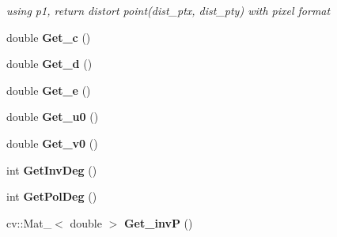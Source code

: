 \begin{DoxyCompactItemize}
\begin{DoxyCompactList}\small\item\em using p1, return distort point(dist\+\_\+ptx, dist\+\_\+pty) with pixel format \end{DoxyCompactList}\item 
double {\bfseries Get\+\_\+c} ()\hypertarget{classMultiColSLAM_1_1cCamModelGeneral___a655e3c58d273b15831d84ae96a27fcb0}{}\label{classMultiColSLAM_1_1cCamModelGeneral___a655e3c58d273b15831d84ae96a27fcb0}

\item 
double {\bfseries Get\+\_\+d} ()\hypertarget{classMultiColSLAM_1_1cCamModelGeneral___a366478b0d58a574cb3dae435aebfaeef}{}\label{classMultiColSLAM_1_1cCamModelGeneral___a366478b0d58a574cb3dae435aebfaeef}

\item 
double {\bfseries Get\+\_\+e} ()\hypertarget{classMultiColSLAM_1_1cCamModelGeneral___a55b4ed20744dbd1689a2c893fc5b4d43}{}\label{classMultiColSLAM_1_1cCamModelGeneral___a55b4ed20744dbd1689a2c893fc5b4d43}

\item 
double {\bfseries Get\+\_\+u0} ()\hypertarget{classMultiColSLAM_1_1cCamModelGeneral___a049554288f2a91d73f74967647063dab}{}\label{classMultiColSLAM_1_1cCamModelGeneral___a049554288f2a91d73f74967647063dab}

\item 
double {\bfseries Get\+\_\+v0} ()\hypertarget{classMultiColSLAM_1_1cCamModelGeneral___a4bb388fd7b1e0b95a1c85a21ed3096e1}{}\label{classMultiColSLAM_1_1cCamModelGeneral___a4bb388fd7b1e0b95a1c85a21ed3096e1}

\item 
int {\bfseries Get\+Inv\+Deg} ()\hypertarget{classMultiColSLAM_1_1cCamModelGeneral___aab749faa195689bbac612c8579d2651f}{}\label{classMultiColSLAM_1_1cCamModelGeneral___aab749faa195689bbac612c8579d2651f}

\item 
int {\bfseries Get\+Pol\+Deg} ()\hypertarget{classMultiColSLAM_1_1cCamModelGeneral___a7bb2f12c44cd6e808506b4a6c38b1cc2}{}\label{classMultiColSLAM_1_1cCamModelGeneral___a7bb2f12c44cd6e808506b4a6c38b1cc2}

\item 
cv\+::\+Mat\+\_\+$<$ double $>$ {\bfseries Get\+\_\+invP} ()\hypertarget{classMultiColSLAM_1_1cCamModelGeneral___a6bb961e22ed4b0792031907e24dc25d9}{}\label{classMultiColSLAM_1_1cCamModelGeneral___a6bb961e22ed4b0792031907e24dc25d9}


\end{DoxyCompactItemize}
